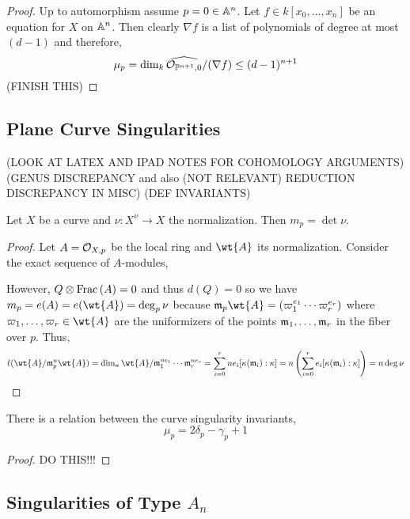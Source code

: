 \documentclass[12pt]{article}
\begin{document}
\begin{proof}
Up to automorphism assume $p = 0 \in \mathbb{A}^n$. Let $f \in k[x_0, \dots, x_n]$ be an equation for $X$ on $\mathbb{A}^n$. Then clearly $\nabla f$ is a list of polynomials of degree at most $(d-1)$ and therefore,
\[ \mu_p = \dim_{k} \widehat{\mathcal{O}_{\mathbb{P}^{n+1}, 0}}/(\nabla f) \le (d - 1)^{n+1} \]
(FINISH THIS)
\end{proof}

\subsection{Plane Curve Singularities}

(LOOK AT LATEX AND IPAD NOTES FOR COHOMOLOGY ARGUMENTS) (GENUS DISCREPANCY and also (NOT RELEVANT) REDUCTION DISCREPANCY IN MISC)
(DEF INVARIANTS)

\begin{prop}
Let $X$ be a curve and $\nu : X^\nu \to X$ the normalization. Then $m_p = \det{\nu}$.
\end{prop}

\begin{proof}
Let $A = \mathcal{O}_{X, p}$ be the local ring and $\wt{A}$ its normalization. Consider the exact sequence of $A$-modules,
\begin{center}
\end{center}
However, $Q \otimes \mathrm{Frac}\left(A\right) = 0$ and thus $d(Q) = 0$ so we have $m_p = e(A) = e(\wt{A}) = \deg_p{\nu}$ because $\m_p \wt{A} = (\varpi_1^{e_1} \cdots \varpi_r^{e_r})$ where $\varpi_1, \dots, \varpi_r \in \wt{A}$ are the uniformizers of the points $\mathfrak{m}_1, \dots, \mathfrak{m}_r$ in the fiber over $p$. Thus,
\[ \ell(\wt{A} / \m_p^n \wt{A}) = \dim_{\kappa} \wt{A} / \m_1^{n e_1} \cdots \m_r^{n e_r} = \sum_{i = 0}^r n e_i [\kappa(\m_i) : \kappa] = n \left( \sum_{i = 0}^r e_i [\kappa(\m_i) : \kappa] \right) = n \deg{\nu} \]
\end{proof}

\begin{prop}
There is a relation between the curve singularity invariants,
\[ \mu_p = 2 \delta_p - \gamma_p + 1 \]
\end{prop}

\begin{proof}
DO THIS!!!
\end{proof}

\subsection{Singularities of Type $A_n$}
\end{document}

